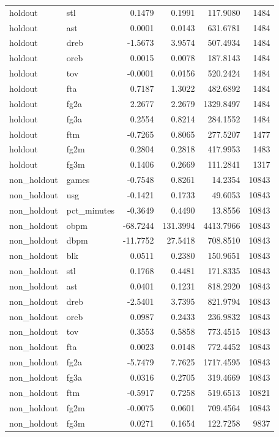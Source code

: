 \begin{table}
\begin{tabular}{llrrrr}
holdout & stl & 0.1479 & 0.1991 & 117.9080 & 1484 \\
holdout & ast & 0.0001 & 0.0143 & 631.6781 & 1484 \\
holdout & dreb & -1.5673 & 3.9574 & 507.4934 & 1484 \\
holdout & oreb & 0.0015 & 0.0078 & 187.8143 & 1484 \\
holdout & tov & -0.0001 & 0.0156 & 520.2424 & 1484 \\
holdout & fta & 0.7187 & 1.3022 & 482.6892 & 1484 \\
holdout & fg2a & 2.2677 & 2.2679 & 1329.8497 & 1484 \\
holdout & fg3a & 0.2554 & 0.8214 & 284.1552 & 1484 \\
holdout & ftm & -0.7265 & 0.8065 & 277.5207 & 1477 \\
holdout & fg2m & 0.2804 & 0.2818 & 417.9953 & 1483 \\
holdout & fg3m & 0.1406 & 0.2669 & 111.2841 & 1317 \\
non\_holdout & games & -0.7548 & 0.8261 & 14.2354 & 10843 \\
non\_holdout & usg & -0.1421 & 0.1733 & 49.6053 & 10843 \\
non\_holdout & pct\_minutes & -0.3649 & 0.4490 & 13.8556 & 10843 \\
non\_holdout & obpm & -68.7244 & 131.3994 & 4413.7966 & 10843 \\
non\_holdout & dbpm & -11.7752 & 27.5418 & 708.8510 & 10843 \\
non\_holdout & blk & 0.0511 & 0.2380 & 150.9651 & 10843 \\
non\_holdout & stl & 0.1768 & 0.4481 & 171.8335 & 10843 \\
non\_holdout & ast & 0.0401 & 0.1231 & 818.2920 & 10843 \\
non\_holdout & dreb & -2.5401 & 3.7395 & 821.9794 & 10843 \\
non\_holdout & oreb & 0.0987 & 0.2433 & 236.9832 & 10843 \\
non\_holdout & tov & 0.3553 & 0.5858 & 773.4515 & 10843 \\
non\_holdout & fta & 0.0023 & 0.0148 & 772.4452 & 10843 \\
non\_holdout & fg2a & -5.7479 & 7.7625 & 1717.4595 & 10843 \\
non\_holdout & fg3a & 0.0316 & 0.2705 & 319.4669 & 10843 \\
non\_holdout & ftm & -0.5917 & 0.7258 & 519.6513 & 10821 \\
non\_holdout & fg2m & -0.0075 & 0.0601 & 709.4564 & 10843 \\
non\_holdout & fg3m & 0.0271 & 0.1654 & 122.7258 & 9837 \\
\bottomrule
\end{tabular}
\end{table}
